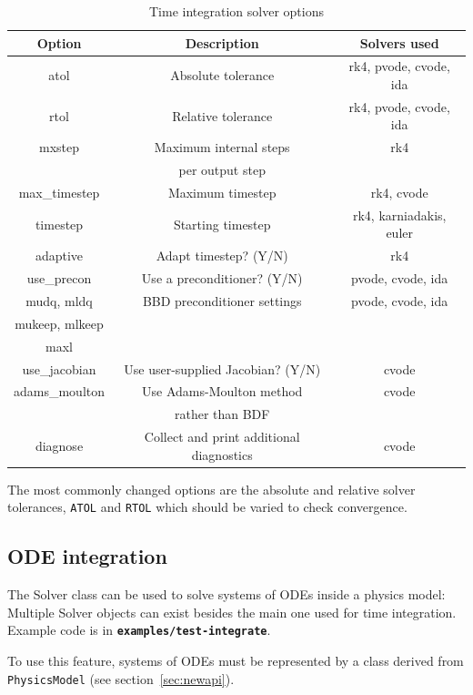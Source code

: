 \documentclass[12pt]{article}
\newcommand{\code}[1]{\texttt{#1}}
\newcommand{\file}[1]{\texttt{\bf #1}}
\begin{document}
\begin{table}[htb!]
\centering
\caption{Time integration solver options}
%
\label{tab:solveropts}
%
\begin{tabular}{c | c | c}
\hline
Option & Description & Solvers used \\
\hline
atol & Absolute tolerance & rk4, pvode, cvode, ida \\
rtol & Relative tolerance & rk4, pvode, cvode, ida \\
mxstep & Maximum internal steps  & rk4 \\
       & per output step & \\
max\_timestep & Maximum timestep & rk4, cvode \\
timestep & Starting timestep & rk4, karniadakis, euler \\
adaptive & Adapt timestep? (Y/N) & rk4 \\
use\_precon & Use a preconditioner? (Y/N) & pvode, cvode, ida \\
mudq, mldq & BBD preconditioner settings & pvode, cvode, ida \\
mukeep, mlkeep & & \\
maxl & & \\
use\_jacobian & Use user-supplied Jacobian? (Y/N) & cvode \\
adams\_moulton & Use Adams-Moulton method & cvode \\
 & rather than BDF & \\
diagnose & Collect and print additional diagnostics & cvode \\
\hline
\end{tabular}
%
\end{table}
%
The most commonly changed options are the  absolute and relative solver
tolerances, \code{ATOL} and \code{RTOL} which should be varied to check
convergence.



\subsection{ODE integration}
%
The Solver class can be used to solve systems of ODEs inside a physics model:
Multiple Solver objects can exist besides the main one used for time
integration.  Example code is in \file{examples/test-integrate}.

To use this feature, systems of ODEs must be represented by a class derived
from \code{PhysicsModel} (see section~\ref{sec:newapi}).
\end{document}
